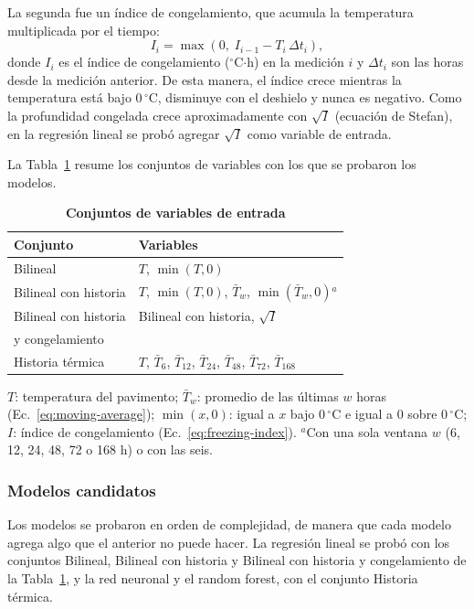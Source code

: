 \documentclass[9pt,twocolumn,twoside]{opticajnl}
\begin{document}
La segunda fue un índice de congelamiento, que acumula la temperatura multiplicada por el tiempo:
\begin{equation}
I_i = \max\left(0,\; I_{i-1} - T_i\,\Delta t_i\right),
\label{eq:freezing-index}
\end{equation}
donde $I_i$ es el índice de congelamiento ($^\circ$C$\cdot$h) en la medición $i$ y $\Delta t_i$ son las horas desde la medición anterior. De esta manera, el índice crece mientras la temperatura está bajo $0\,^\circ$C, disminuye con el deshielo y nunca es negativo. Como la profundidad congelada crece aproximadamente con $\sqrt{I}$ (ecuación de Stefan), en la regresión lineal se probó agregar $\sqrt{I}$ como variable de entrada.

La Tabla~\ref{tab:feature-sets} resume los conjuntos de variables con los que se probaron los modelos.

\begin{table}[H]
\centering
\caption{\bf Conjuntos de variables de entrada}
\small
\begin{tabular}{ll}
\hline
Conjunto & Variables \\
\hline
Bilineal & $T$, $\min(T,0)$ \\
Bilineal con historia & $T$, $\min(T,0)$, $\bar{T}_w$, $\min(\bar{T}_w,0)$$^\textit{a}$ \\
Bilineal con historia & Bilineal con historia, $\sqrt{I}$ \\
\quad y congelamiento & \\
Historia térmica & $T$, $\bar{T}_6$, $\bar{T}_{12}$, $\bar{T}_{24}$, $\bar{T}_{48}$, $\bar{T}_{72}$, $\bar{T}_{168}$ \\
\hline
\end{tabular}
  \label{tab:feature-sets}

\smallskip
\footnotesize
$T$: temperatura del pavimento; $\bar{T}_w$: promedio de las últimas $w$ horas (Ec.~\eqref{eq:moving-average}); $\min(x,0)$: igual a $x$ bajo $0\,^\circ$C e igual a 0 sobre $0\,^\circ$C; $I$: índice de congelamiento (Ec.~\eqref{eq:freezing-index}). $^\textit{a}$Con una sola ventana $w$ (6, 12, 24, 48, 72 o 168 h) o con las seis.
\end{table}

\subsubsection{Modelos candidatos}
\label{sec:candidate-models}

Los modelos se probaron en orden de complejidad, de manera que cada modelo agrega algo que el anterior no puede hacer. La regresión lineal se probó con los conjuntos Bilineal, Bilineal con historia y Bilineal con historia y congelamiento de la Tabla~\ref{tab:feature-sets}, y la red neuronal y el random forest, con el conjunto Historia térmica.
\end{document}
